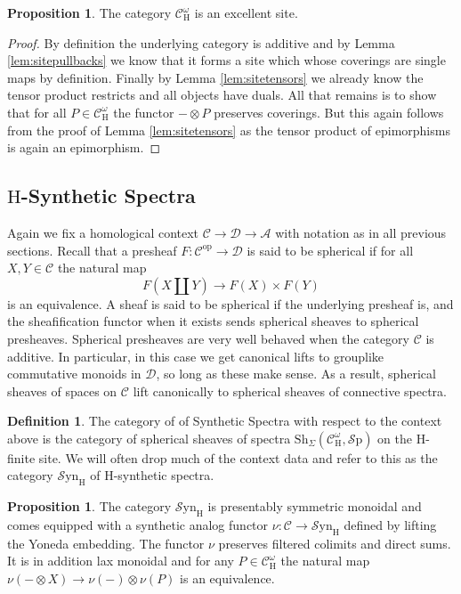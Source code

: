 \documentclass[10pt]{amsart}
\theoremstyle{definition}
\numberwithin{figure}{section}
\numberwithin{equation}{section}
\newtheorem{proposition}[figure]{Proposition}
\newtheorem{definition}[figure]{Definition}
\newcommand{\op}{\mathrm{op}}
\newcommand{\cA}{\mathcal{A}}
\newcommand{\cC}{\mathcal{C}}
\newcommand{\cD}{\mathcal{D}}
\theoremstyle{cited}
\newcommand{\Sp}{{\mathcal{S}\mathrm{p}}}
\newcommand{\Sh}{\mathrm{Sh}}
\newcommand{\Syn}{\mathcal{S}\mathrm{yn}}
\renewcommand{\H}{\mathrm{H}}
\begin{document}
\begin{proposition}
  The category $\cC^\omega_\H$ is an excellent site.
\end{proposition}

\begin{proof}
  By definition the underlying category is additive and by Lemma \ref{lem:sitepullbacks} we know that it forms a site which whose coverings are single maps by definition. Finally by Lemma \ref{lem:sitetensors} we already know the tensor product restricts and all objects have duals. All that remains is to show that for all $P\in \cC^\omega_\H$ the functor $-\otimes P$ preserves coverings. But this again follows from the proof of Lemma \ref{lem:sitetensors} as the tensor product of epimorphisms is again an epimorphism.
\end{proof}

\subsection{$\H$-Synthetic Spectra}

Again we fix a homological context $\cC\to \cD\to \cA$ with notation as in all previous sections. Recall that a presheaf $F:\cC^\op\to \cD$ is said to be spherical if for all $X,Y\in \cC$ the natural map
\[
F(X\amalg Y)\to F(X)\times F(Y)
\]
is an equivalence. A sheaf is said to be spherical if the underlying presheaf is, and the sheafification functor when it exists sends spherical sheaves to spherical presheaves. Spherical presheaves are very well behaved when the category $\cC$ is additive. In particular, in this case we get canonical lifts to grouplike commutative monoids in $\cD$, so long as these make sense. As a result, spherical sheaves of spaces on $\cC$ lift canonically to spherical sheaves of connective spectra.

\begin{definition}
  The category of of Synthetic Spectra with respect to the context above is the category of spherical sheaves of spectra $\Sh_\Sigma(\cC^\omega_\H, \Sp)$ on the $\H$-finite site. We will often drop much of the context data and refer to this as the category $\Syn_\H$ of $\H$-synthetic spectra.
\end{definition}

\begin{proposition}
  The category $\Syn_\H$ is presentably symmetric monoidal and comes equipped with a synthetic analog functor $\nu:\cC\to \Syn_\H$ defined by lifting the Yoneda embedding. The functor $\nu$ preserves filtered colimits and direct sums. It is in addition lax monoidal and for any $P\in \cC^\omega_\H$ the natural map $\nu(-\otimes X)\to \nu(-)\otimes \nu(P)$ is an equivalence.
\end{proposition}
\end{document}
